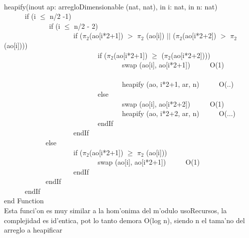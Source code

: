 \documentclass[a4paper,10pt]{article}
\begin{document}
\begin{algoritmo}
\caption{}\\
  heapify(inout ap: arregloDimensionable (nat, nat), in i: nat, in n: nat)\\
	\indent \ \ \ \ \ \  if (i $\leq$ n/2 -1)   \\
	\indent \ \ \ \ \ \ \ \ \ \ \ \ \ if (i $\leq$ n/2 - 2)   \\
	\indent \ \ \ \ \ \ \ \ \ \ \ \ \ \ \ \ \ \ \ \ if ($\pi_2$(ao[i*2+1]) $>$ $\pi_2$ (ao[i]) $||$ ($\pi_2$(ao[i*2+2]) $>$ $\pi_2$ (ao[i]))) \\
	\indent \ \ \ \ \ \ \ \ \ \ \ \ \ \ \ \ \ \ \ \ \ \ \ \ \ \ \ if ($\pi_2$(ao[i*2+1]) $\geq$ ($\pi_2$(ao[i*2+2])))  \\
	\indent \ \ \ \ \ \ \ \ \ \ \ \ \ \ \ \ \ \ \ \ \ \ \ \ \ \ \ \ \ \ \ \ \ \ swap (ao[i], ao[i*2+1]) \ \ \ \ \ O(1) \\\\
	\indent \ \ \ \ \ \ \ \ \ \ \ \ \ \ \ \ \ \ \ \ \ \ \ \ \ \ \ \ \ \ \ \ \ \ heapify (ao, i*2+1, ar, n) \ \ \ \ \ O(..) \\
	\indent \ \ \ \ \ \ \ \ \ \ \ \ \ \ \ \ \ \ \ \ \ \ \ \ \ \ \ else \\
	\indent \ \ \ \ \ \ \ \ \ \ \ \ \ \ \ \ \ \ \ \ \ \ \ \ \ \ \ \ \ \ \ \ \ \ swap (ao[i], ao[i*2+2]) \ \ \ \ \ O(1) \\
	\indent \ \ \ \ \ \ \ \ \ \ \ \ \ \ \ \ \ \ \ \ \ \ \ \ \ \ \ \ \ \ \ \ \ \ heapify (ao, i*2+2, ar, n) \ \ \ \ \ O(...) \\
	\indent \ \ \ \ \ \ \ \ \ \ \ \ \ \ \ \ \ \ \ \ \ \ \ \ \ \ \ endIf \\
	\indent \ \ \ \ \ \ \ \ \ \ \ \ \ \ \ \ \ \ \ \  endIf \\
	\indent \ \ \ \ \ \ \ \ \ \ \ \  else \\
	\indent \ \ \ \ \ \ \ \ \ \ \ \ \ \ \ \ \ \ \ \ if ($\pi_2$(ao[i*2+1]) $\geq$ $\pi_2$ (ao[i]))  \\
	\indent \ \ \ \ \ \ \ \ \ \ \ \ \ \ \ \ \ \ \ \ \ \ \ \ \ \ \  swap (ao[i], ao[i*2+1]) \ \ \ \ \ O(1) \\
	\indent \ \ \ \ \ \ \ \ \ \ \ \ \ \ \ \ \ \ \ \  endIf \\
	\indent \ \ \ \ \ \ \ \ \ \ \ \ endIf \\
	\indent \ \ \ \ \ \ endIf \\
   end Function \\

Esta funci'on es muy similar a la hom'onima del m'odulo usoRecursos, la complejidad es id'entica, pot lo tanto demora O(log n), siendo n el tama'no del arreglo a heapificar
\end{algoritmo}
\end{document}
